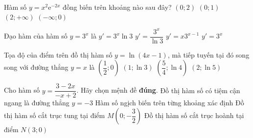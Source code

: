 \begin{ex}%
Hàm số $y=x^2\mathrm{e}^{-2x}$ đồng biến trên khoảng nào sau đây?
\choice
{$(0;2)$}
{\True $(0;1)$}
{$(2;+\infty)$}
{$(-\infty;0)$}
\end{ex}

\begin{ex}%
Đạo hàm của hàm số $y=3^x$ là
\choice
{\True $y'=3^x\ln 3$}
{$y'=\dfrac{3^x}{\ln 3}$}
{$y'=x3^{x-1}$}
{$y'=3^x$}
\end{ex}

\begin{ex}%
Tọa độ của điểm trên đồ thị hàm số $y=\ln(4x-1)$, mà tiếp tuyến tại đó song song với đường thẳng $y=x$ là
\choice
{$\left(\dfrac{1}{2};0\right)$}
{$(1;\ln 3)$}
{\True $\left(\dfrac{5}{4};\ln 4\right)$}
{$(2;\ln 5)$}
\end{ex}

\begin{ex}%
Cho hàm số $y=\dfrac{3-2x}{-x+2}$. Hãy chọn mệnh đề \textbf{đúng}.
\choice
{Đồ thị hàm số có tiệm cận ngang là đường thẳng $y=-3$}
{\True Hàm số ngịch biến trên từng khoảng xác định}
{Đồ thị hàm số cắt trục tung tại điểm $M\left(0;-\dfrac{3}{2}\right)$}
{Đồ thị hàm số cắt trục hoành tại điểm $N(3;0)$}
\end{ex}

